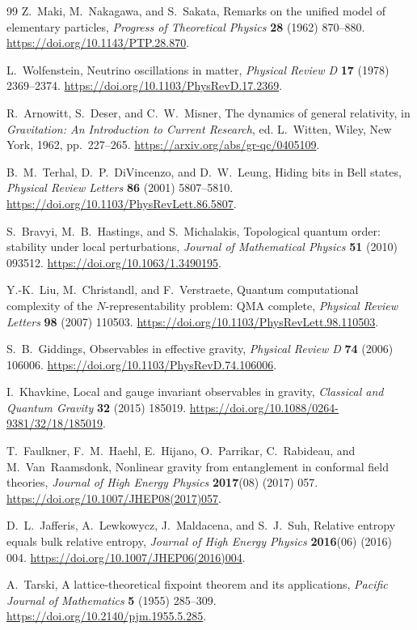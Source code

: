 \documentclass[11pt]{article}
\theoremstyle{definition}
\begin{document}
\begin{thebibliography}{99}
Z.~Maki, M.~Nakagawa, and S.~Sakata, Remarks on the unified model of elementary
particles, \emph{Progress of Theoretical Physics} \textbf{28} (1962) 870--880.
\url{https://doi.org/10.1143/PTP.28.870}.

L.~Wolfenstein, Neutrino oscillations in matter, \emph{Physical Review D}
\textbf{17} (1978) 2369--2374.
\url{https://doi.org/10.1103/PhysRevD.17.2369}.

R.~Arnowitt, S.~Deser, and C.~W.~Misner, The dynamics of general relativity,
in \emph{Gravitation: An Introduction to Current Research}, ed. L.~Witten,
Wiley, New York, 1962, pp.~227--265.
\url{https://arxiv.org/abs/gr-qc/0405109}.


B.~M.~Terhal, D.~P.~DiVincenzo, and D.~W.~Leung, Hiding bits in Bell states,
\emph{Physical Review Letters} \textbf{86} (2001) 5807--5810.
\url{https://doi.org/10.1103/PhysRevLett.86.5807}.

S.~Bravyi, M.~B.~Hastings, and S.~Michalakis, Topological quantum order:
stability under local perturbations, \emph{Journal of Mathematical Physics}
\textbf{51} (2010) 093512.
\url{https://doi.org/10.1063/1.3490195}.

Y.-K.~Liu, M.~Christandl, and F.~Verstraete, Quantum computational complexity of
the $N$-representability problem: QMA complete, \emph{Physical Review Letters}
\textbf{98} (2007) 110503.
\url{https://doi.org/10.1103/PhysRevLett.98.110503}.

S.~B.~Giddings, Observables in effective gravity, \emph{Physical Review D}
\textbf{74} (2006) 106006.
\url{https://doi.org/10.1103/PhysRevD.74.106006}.

I.~Khavkine, Local and gauge invariant observables in gravity,
\emph{Classical and Quantum Gravity} \textbf{32} (2015) 185019.
\url{https://doi.org/10.1088/0264-9381/32/18/185019}.

T.~Faulkner, F.~M.~Haehl, E.~Hijano, O.~Parrikar, C.~Rabideau, and
M.~Van~Raamsdonk, Nonlinear gravity from entanglement in conformal field theories,
\emph{Journal of High Energy Physics} \textbf{2017}(08) (2017) 057.
\url{https://doi.org/10.1007/JHEP08(2017)057}.

D.~L.~Jafferis, A.~Lewkowycz, J.~Maldacena, and S.~J.~Suh, Relative entropy equals
bulk relative entropy, \emph{Journal of High Energy Physics} \textbf{2016}(06)
(2016) 004.
\url{https://doi.org/10.1007/JHEP06(2016)004}.

A.~Tarski, A lattice-theoretical fixpoint theorem and its applications,
\emph{Pacific Journal of Mathematics} \textbf{5} (1955) 285--309.
\url{https://doi.org/10.2140/pjm.1955.5.285}.

\end{thebibliography}
\end{document}
